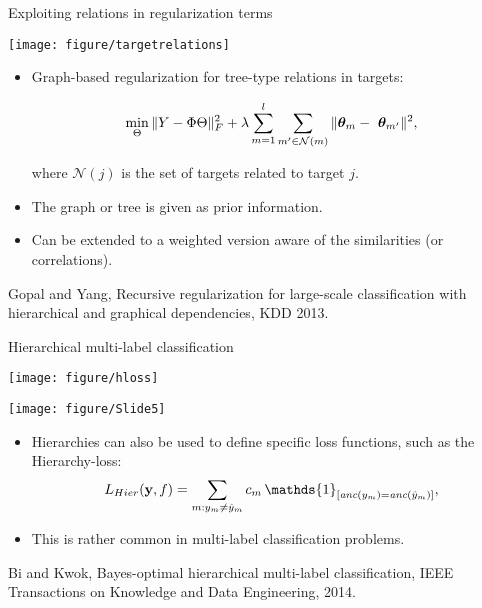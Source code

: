 \documentclass[11pt,compress,t,notes=noshow, xcolor=table]{beamer}
\begin{document}
\begin{frame}{Exploiting relations in regularization terms}

	\begin{center}
		\texttt{[image: figure/targetrelations]}
	\end{center} 

	\begin{itemize}
		\item Graph-based regularization for tree-type relations in targets: 

		\begin{equation*}
			\min_\Theta \|Y - \Phi \Theta \|^2_F + \lambda \sum_{m=1}^l \sum_{m' \in \mathcal{N}(m)} \|\thetab_m - \ \thetab_{m'}\|^2,
		\end{equation*}

		where $\mathcal{N}(j)$ is the set of targets related to target $j.$
        \item The graph or tree is given as prior information.
		
		\item Can be extended to a weighted version aware of the similarities (or correlations).
	
	\end{itemize}

	{\tiny Gopal and Yang, Recursive regularization for large-scale classification with hierarchical and graphical dependencies, KDD 2013.}
\end{frame}

\begin{frame}{Hierarchical multi-label classification}
	
	\begin{minipage}{0.60\textwidth}  
        \centering
        \texttt{[image: figure/hloss]}
    \end{minipage}
    \hfill
    \begin{minipage}{0.39\textwidth}    
        \centering
		\texttt{[image: figure/Slide5]}
    \end{minipage}
    
    \begin{itemize}
        \item  Hierarchies can also be used to define specific loss functions, such as the Hierarchy-loss: $$L_{Hier}(\yv, f) = \sum_{m: y_m \neq \hat{y}_m} c_m \, \mathds{1}_{ [\textit{anc}(y_m) = \textit{anc}(\hat{y}_m)]  },$$
        \item This is rather common in multi-label classification problems.
    \end{itemize}
    
	{\tiny Bi and Kwok, Bayes-optimal hierarchical multi-label classification, IEEE Transactions on Knowledge and Data Engineering, 2014.}

\end{frame}
\end{document}

